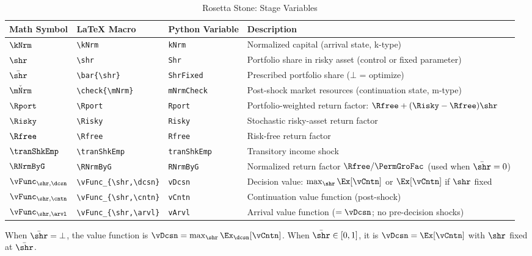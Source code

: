 \documentclass[SolvingMicroDSOPs]{subfiles}
\begin{document}
\begin{table}[h]
\caption{Rosetta Stone:  Stage Variables}
\label{tab:rosetta-portable}
\begin{center}
\begin{tabular}{l|l|l|l}
Math Symbol & \LaTeX{} Macro & Python Variable & Description \\
\hline
$\kNrm$             & \verb|\kNrm|             & \texttt{kNrm}        & Normalized capital (arrival state, k-type) \\
$\shr$              & \verb|\shr|              & \texttt{Shr}         & Portfolio share in risky asset (control or fixed parameter) \\
$\bar{\shr}$        & \verb|\bar{\shr}|        & \texttt{ShrFixed}    & Prescribed portfolio share ($\bot$ = optimize) \\
$\check{\mNrm}$     & \verb|\check{\mNrm}|     & \texttt{mNrmCheck}   & Post-shock market resources (continuation state, m-type) \\
$\Rport$            & \verb|\Rport|            & \texttt{Rport}       & Portfolio-weighted return factor: $\Rfree + (\Risky - \Rfree)\shr$ \\
$\Risky$            & \verb|\Risky|            & \texttt{Risky}       & Stochastic risky-asset return factor \\
$\Rfree$            & \verb|\Rfree|            & \texttt{Rfree}       & Risk-free return factor \\
$\tranShkEmp$       & \verb|\tranShkEmp|       & \texttt{tranShkEmp}  & Transitory income shock \\
$\RNrmByG$          & \verb|\RNrmByG|          & \texttt{RNrmByG}     & Normalized return factor $\Rfree / \PermGroFac$ (used when $\bar{\shr}=0$) \\
$\vFunc_{\shr,\dcsn}$ & \verb|\vFunc_{\shr,\dcsn}| & \texttt{vDcsn}  & Decision value: $\max_{\shr} \Ex[\vCntn]$ or $\Ex[\vCntn]$ if $\shr$ fixed \\
$\vFunc_{\shr,\cntn}$ & \verb|\vFunc_{\shr,\cntn}| & \texttt{vCntn}  & Continuation value function (post-shock) \\
$\vFunc_{\shr,\arvl}$ & \verb|\vFunc_{\shr,\arvl}| & \texttt{vArvl}  & Arrival value function ($= \vDcsn$; no pre-decision shocks) \\
\hline
\end{tabular}
\end{center}
\end{table}

\noindent When $\bar{\shr} = \bot$, the {\Decision} value function is $\vDcsn = \max_{\shr} \Ex_{\dcsn}[\vCntn]$.  When $\bar{\shr} \in [0,1]$, it is $\vDcsn = \Ex[\vCntn]$ with $\shr$ fixed at $\bar{\shr}$.
\end{document}
